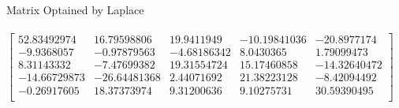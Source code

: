 \newcommand\tab[1][1cm]{\hspace*{#1}}
\begin{answer}
\\ \\
Matrix Optained by Laplace\\  \\
$ 
\begin{bmatrix}
52.83492974  & 16.79598806   & 19.9411949 &   -10.19841036 &  -20.8977174 \\
 -9.9368057  &   -0.97879563  &  -4.68186342   &  8.0430365   &   1.79099473\\ 
   8.31143332   & -7.47699382   & 19.31554724  &  15.17460858 &  -14.32640472\\
 -14.66729873  & -26.64481368    & 2.44071692  &  21.38223128   & -8.42094492\\
  -0.26917605   & 18.37373974    & 9.31200636  &   9.10275731  &  30.59390495\\ \end{bmatrix}
$
\\ \\
\end{answer}
